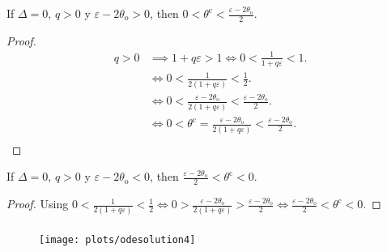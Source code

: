 \documentclass[
    8pt,
    aspectratio=1610,
    c,
    intlimits,
    leqno,
    professionalfonts,
]{beamer}
\begin{document}
\begin{frame}
	\begin{theorem}
		If $\Delta=0$, $q>0$ y $\varepsilon-2\theta_{\text{o}}>0$, then
		$0<\theta^{\text{c}}<\frac{\varepsilon-2\theta_{\text{o}}}{2}$.
	\end{theorem}

	\begin{proof}
		\begin{align*}
			q>0 & \implies
			1+q\varepsilon>1\iff
			0<\frac{1}{1+q\varepsilon}<1.                                                                                                     \\
			    & \iff
			0<\frac{1}{2\left(1+q\varepsilon\right)}<\frac{1}{2}.                                                                             \\
			    & \iff
			0<\frac{\varepsilon-2\theta_{\text{o}}}{2\left(1+q\varepsilon\right)}<\frac{\varepsilon-2\theta_{\text{o}}}{2}.                   \\
			    & \iff
			0<\theta^{\text{c}}=\frac{\varepsilon-2\theta_{\text{o}}}{2\left(1+q\varepsilon\right)}<\frac{\varepsilon-2\theta_{\text{o}}}{2}. \\
		\end{align*}
	\end{proof}

	\begin{theorem}
		If $\Delta=0$, $q>0$ y $\varepsilon-2\theta_{\text{o}}<0$, then
		$\frac{\varepsilon-2\theta_{\text{o}}}{2}<\theta^{\text{c}}<0$.
	\end{theorem}

	\begin{proof}
		Using
		\begin{math}
			0<\frac{1}{2\left(1+q\varepsilon\right)}<
			\frac{1}{2}\iff
			0>\frac{\varepsilon-2\theta_{\text{o}}}{2\left(1+q\varepsilon\right)}>
			\frac{\varepsilon-2\theta_{\text{o}}}{2}\iff
			\frac{\varepsilon-2\theta_{\text{o}}}{2}<\theta^{\text{c}}<0
		\end{math}.
	\end{proof}
\end{frame}

\begin{frame}[fragile]
	\frametitle{\secname}

	\begin{figure}[ht!]
		\centering
		\texttt{[image: plots/odesolution4]}
		\caption{}
	\end{figure}
\end{frame}
\end{document}
